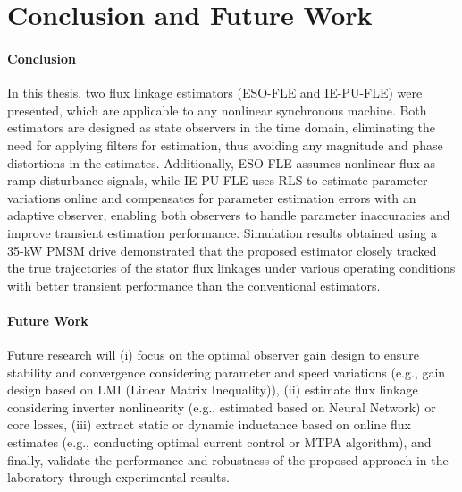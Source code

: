 \chapter{Conclusion and Future Work}\label{chapter5}
\subsubsection{Conclusion}
In this thesis, two flux linkage estimators (ESO-FLE and IE-PU-FLE) were presented, which are applicable to any nonlinear synchronous machine.  Both estimators are designed as state observers in the time domain, eliminating the need for applying filters for estimation, thus avoiding any magnitude and phase distortions in the estimates. Additionally, ESO-FLE assumes nonlinear flux as ramp disturbance signals, while IE-PU-FLE uses RLS to estimate parameter variations online and compensates for parameter estimation errors with an adaptive observer, enabling both observers to handle parameter inaccuracies and improve transient estimation performance. Simulation results obtained using a 35-kW PMSM drive demonstrated that the proposed estimator closely tracked the true trajectories of the stator flux linkages under various operating conditions with better transient performance than the conventional estimators. 

\subsubsection{Future Work}

Future research will (i) focus on the optimal observer gain design to ensure stability and convergence considering parameter and speed variations (e.g., gain design based on LMI (Linear Matrix Inequality)), (ii) estimate flux linkage considering inverter nonlinearity (e.g., estimated based on Neural Network) or core losses, (iii) extract static or dynamic inductance based on online flux estimates (e.g., conducting optimal current control or MTPA algorithm), and finally, validate the performance and robustness of the proposed approach in the laboratory through experimental results.
